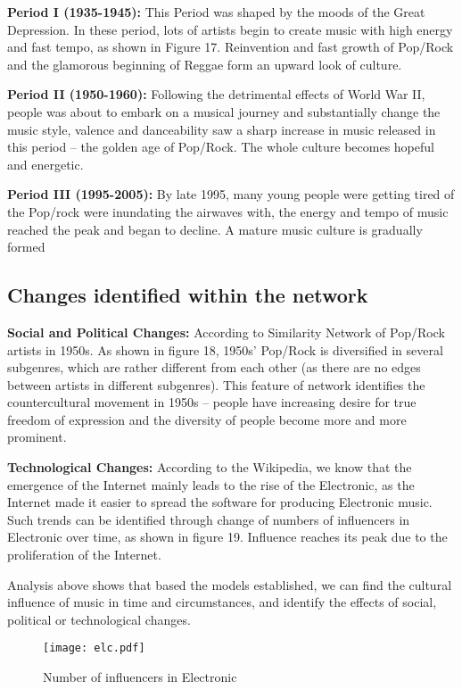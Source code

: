 \documentclass[12pt]{article}  %
\begin{document}
	\textbf{Period I (1935-1945):} This Period was shaped by the moods of the Great Depression. In
	these period, lots of artists begin to create music with high energy and fast tempo, as shown in
	Figure 17. Reinvention and fast growth of Pop/Rock and the glamorous beginning of Reggae
	form an upward look of culture.
	
	\textbf{Period II (1950-1960):} Following the detrimental effects of World War II, people was about
	to embark on a musical journey and substantially change the music style, valence and danceability saw a sharp increase in music released in this period – the golden age of Pop/Rock. The
	whole culture becomes hopeful and energetic.
	
	\textbf{Period III (1995-2005):} By late 1995, many young people were getting tired of the Pop/rock
	were inundating the airwaves with, the energy and tempo of music reached the peak and began
	to decline. A mature music culture is gradually formed
	
	\subsection{Changes identified within the network}
	
	\textbf{Social and Political Changes:} According to Similarity Network of Pop/Rock
	artists in 1950s. As shown in figure 18, 1950s’ Pop/Rock is diversified in several subgenres,
	which are rather different from each other (as there are no edges between artists in different
	subgenres). This feature of network identifies the countercultural movement in 1950s – people
	have increasing desire for true freedom of expression and the diversity of people become more
	and more prominent.
	
	\textbf{Technological Changes:} According to the Wikipedia, we know that the emergence of the
	Internet mainly leads to the rise of the Electronic, as the Internet made it easier to spread the
	software for producing Electronic music. Such trends can be identified through change of numbers of influencers in Electronic over time, as shown in figure 19. Influence reaches its peak
	due to the proliferation of the Internet.
	
	Analysis above shows that based the models established, we can find the cultural influence
	of music in time and circumstances, and identify the effects of social, political or technological
	changes. 
	
	\begin{figure}[htbp]
		\centering
		\texttt{[image: elc.pdf]} 	%
		\caption{Number of influencers in Electronic}		%
		\label{fig:inelc}							%
	\end{figure}
	
\end{document}
